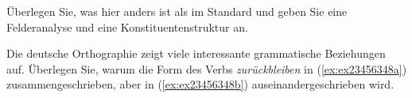 \begin{exe}
\end{exe}

Überlegen Sie, was hier anders ist als im Standard und geben Sie eine Felderanalyse und eine Konstituentenstruktur an.

\Uebung[\tristar] \label{u127} Die deutsche Orthographie zeigt viele interessante grammatische Beziehungen auf.
Überlegen Sie, warum die Form des Verbs \textit{zurückbleiben} in (\ref{ex:ex23456348a}) zusammengeschrieben, aber in (\ref{ex:ex23456348b}) auseinandergeschrieben wird.

\begin{exe}
  \ex\label{ex:ex23456348}
  \begin{xlist}
  \end{xlist}
\end{exe}

